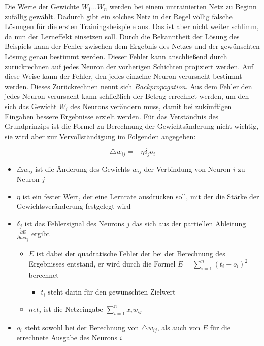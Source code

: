 Die Werte der Gewichte \(W_1 \dots W_n\) werden bei einem untrainierten Netz zu Beginn zufällig gewählt. Dadurch gibt ein solches Netz in der Regel völlig falsche Lösungen für die ersten Trainingsbeispiele aus. Das ist aber nicht weiter schlimm, da nun der Lerneffekt einsetzen soll. Durch die Bekanntheit der Lösung des Beispiels kann der Fehler zwischen dem Ergebnis des Netzes und der gewünschten Lösung genau bestimmt werden. Dieser Fehler kann anschließend durch zurückrechnen auf jedes Neuron der vorherigen Schichten projiziert werden. Auf diese Weise kann der Fehler, den jedes einzelne Neuron verursacht bestimmt werden. Dieses Zurückrechnen nennt sich \textit{Backpropagation}. Aus dem Fehler den jedes Neuron verursacht kann schließlich der Betrag errechnet werden, um den sich das Gewicht \(W_i\) des Neurons verändern muss, damit bei zukünftigen Eingaben bessere Ergebnisse erzielt werden. Für das Verständnis des Grundprinzips ist die Formel zu Berechnung der Gewichtsänderung nicht wichtig, sie wird aber zur Vervollständigung im Folgenden angegeben: 

\begin{equation}
\triangle w_{ij} = -\eta\delta_jo_i
\label{eq:BackProb}
\end{equation}

\begin{itemize}
\item \(\triangle w_{ij}\) ist die Änderung des Gewichts \(w_{ij}\) der Verbindung von Neuron \(i\) zu Neuron \(j\)
\item \(\eta\)  ist ein fester Wert, der eine Lernrate ausdrücken soll, mit der die Stärke der Gewichtsveränderung festgelegt wird
\item \(\delta_j\) ist das Fehlersignal des Neurons \(j\) das sich aus der partiellen Ableitung \(\frac{\partial E}{\partial net_j}\) ergibt\\
\begin{itemize}
\item \(E\) ist dabei der quadratische Fehler der bei der Berechnung des Ergebnisses entstand, er wird durch die Formel \(E = \sum \limits_{i=1}^n (t_i - o_i)^2\) berechnet
\begin{itemize}
\item \(t_i\) steht darin für den gewünschten Zielwert
\end{itemize}
\item \(net_j\) ist die Netzeingabe \(\sum \limits_{i=1}^n x_iw_{ij}\)
\end{itemize}

\item \(o_i\) steht sowohl bei der Berechnung von \(\triangle w_{ij}\), als auch von \(E\) für die errechnete Ausgabe des Neurons \(i\)
\end{itemize}

